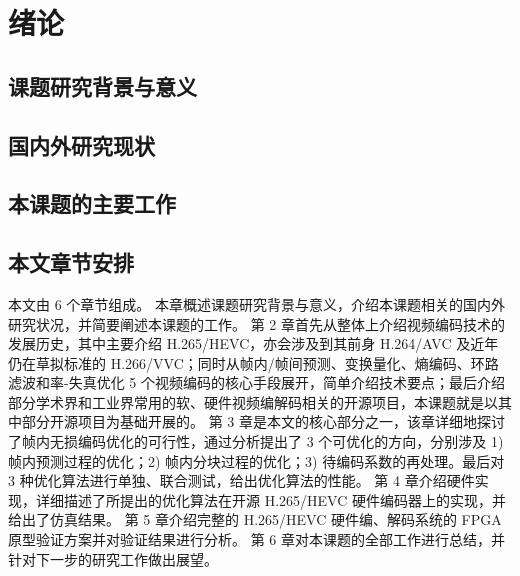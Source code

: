 \chapter{绪论}
\label{cha:c1}

\section{课题研究背景与意义}

\section{国内外研究现状}

\section{本课题的主要工作}
\cite{SAP-SAP1}
\section{本文章节安排}
本文由 6 个章节组成。
本章概述课题研究背景与意义，介绍本课题相关的国内外研究状况，并简要阐述本课题的工作。
第 2 章首先从整体上介绍视频编码技术的发展历史，其中主要介绍 H.265/HEVC，亦会涉及到其前身 H.264/AVC 及近年仍在草拟标准的 H.266/VVC；同时从帧内/帧间预测、变换量化、熵编码、环路滤波和率-失真优化 5 个视频编码的核心手段展开，简单介绍技术要点；最后介绍部分学术界和工业界常用的软、硬件视频编解码相关的开源项目，本课题就是以其中部分开源项目为基础开展的。
第 3 章是本文的核心部分之一，该章详细地探讨了帧内无损编码优化的可行性，通过分析提出了 3 个可优化的方向，分别涉及 1) 帧内预测过程的优化；2) 帧内分块过程的优化；3) 待编码系数的再处理。最后对 3 种优化算法进行单独、联合测试，给出优化算法的性能。
第 4 章介绍硬件实现，详细描述了所提出的优化算法在开源 H.265/HEVC 硬件编码器上的实现，并给出了仿真结果。
第 5 章介绍完整的 H.265/HEVC 硬件编、解码系统的 FPGA 原型验证方案并对验证结果进行分析。
第 6 章对本课题的全部工作进行总结，并针对下一步的研究工作做出展望。

